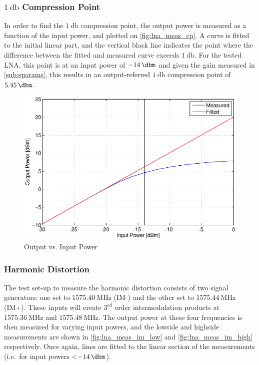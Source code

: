 \documentclass[a4paper]{article}        %
\begin{document}
  \subsubsection{$\SI{1}{\decibel}$ Compression Point}
  In order to find the $\SI{1}{\decibel}$ compression point, the output power is measured as a function of the input power, and plotted on \autoref{fig:lna_meas_cp}.
  A curve is fitted to the initial linear part, and the vertical black line indicates the point where the difference between the fitted and measured curve exceeds $\SI{1}{\decibel}$.
  For the tested LNA, this point is at an input power of $\SI{-14}{\dbm}$ and given the gain measured in \autoref{sub:sparams}, this results in an output-referred $\SI{1}{\decibel}$ compression point of $\SI{5.45}{\dbm}$.

  \begin{figure}[H]
    \centering
    \includegraphics[width=\textwidth]{fig/LNA/compression_lna.eps}
    \caption{Output vs. Input Power}
    \label{fig:lna_meas_cp}
  \end{figure}

  
  \subsubsection{Harmonic Distortion}
  The test set-up to measure the harmonic distortion consists of two signal generators: one set to $\SI{1575.40}{\mega\hertz}$ (IM-) and the other set to $\SI{1575.44}{\mega\hertz}$ (IM+).
  These inputs will create $3^{rd}$ order intermodulation products at $\SI{1575.36}{\mega\hertz}$ and $\SI{1575.48}{\mega\hertz}$.
  The output power at these four frequencies is then measured for varying input powers, and the lowside and highside measurements are shown in \autoref{fig:lna_meas_im_low} and \autoref{fig:lna_meas_im_high} respectively.
  Once again, lines are fitted to the linear section of the measurements (i.e.\ for input powers \textless $\SI{-14}{\dbm}$).
\end{document}
